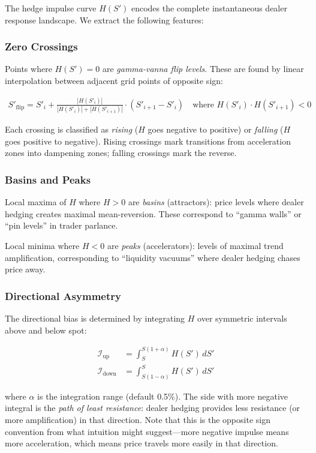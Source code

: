 \documentclass[11pt, a4paper]{article}
\begin{document}
The hedge impulse curve $H(S')$ encodes the complete instantaneous dealer response landscape. We extract the following features:

\subsubsection{Zero Crossings}

Points where $H(S') = 0$ are \emph{gamma-vanna flip levels}. These are found by linear interpolation between adjacent grid points of opposite sign:

\begin{align}
S'_{\text{flip}} = S'_i + \frac{|H(S'_i)|}{|H(S'_i)| + |H(S'_{i+1})|} \cdot (S'_{i+1} - S'_i) \quad \text{where } H(S'_i) \cdot H(S'_{i+1}) < 0
\end{align}

Each crossing is classified as \emph{rising} ($H$ goes negative to positive) or \emph{falling} ($H$ goes positive to negative). Rising crossings mark transitions from acceleration zones into dampening zones; falling crossings mark the reverse.

\subsubsection{Basins and Peaks}

Local maxima of $H$ where $H > 0$ are \emph{basins} (attractors): price levels where dealer hedging creates maximal mean-reversion. These correspond to ``gamma walls'' or ``pin levels'' in trader parlance.

Local minima where $H < 0$ are \emph{peaks} (accelerators): levels of maximal trend amplification, corresponding to ``liquidity vacuums'' where dealer hedging chases price away.

\subsubsection{Directional Asymmetry}

The directional bias is determined by integrating $H$ over symmetric intervals above and below spot:

\begin{align}
\mathcal{I}_{\text{up}} &= \int_S^{S(1+\alpha)} H(S') \, dS' \\
\mathcal{I}_{\text{down}} &= \int_{S(1-\alpha)}^{S} H(S') \, dS'
\end{align}

where $\alpha$ is the integration range (default 0.5\%). The side with more negative integral is the \emph{path of least resistance}: dealer hedging provides less resistance (or more amplification) in that direction. Note that this is the opposite sign convention from what intuition might suggest---more negative impulse means more acceleration, which means price travels more easily in that direction.
\end{document}
